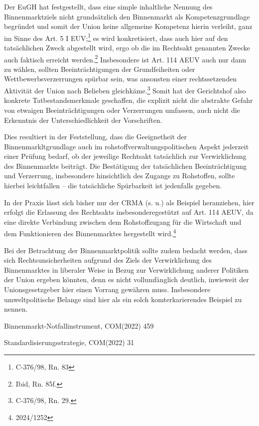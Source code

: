 \documentclass[12pt,a4paper,oneside]{book} %
\begin{document}
Der EuGH hat festgestellt, dass eine simple inhaltliche Nennung des Binnenmarktziels nicht grundsätzlich den Binnenmarkt als Kompetenzgrundlage begründet und somit der Union keine allgemeine Kompetenz hierin verleiht, ganz im Sinne des Art. 5 I EUV;\footnote{C-376/98, Rn. 83} es wird konkretisiert, dass auch hier auf den tatsächlichen Zweck abgestellt wird, ergo ob die im Rechtsakt genannten Zwecke auch faktisch erreicht werden.\footnote{Ibid, Rn. 85f.} Insbesondere ist Art. 114 AEUV auch nur dann zu wählen, sollten Beeinträchtigungen der Grundfeiheiten oder Wettbewerbsverzerrungen spürbar sein, was ansonsten einer rechtssetzenden Aktivität der Union nach Belieben gleichkäme.\footnote{C-376/98, Rn. 29.} Somit hat der Gerichtshof also konkrete Tatbestandsmerkmale geschaffen, die explizit nicht die abstrakte Gefahr von etwaigen Beeinträchtigungen oder Verzerrungen umfassen, auch nicht die Erkenntnis der Unterschiedlichkeit der Vorschriften.\autocite[hierzu ausführlich]{Callies, Berliner Beiträge 117, S. 16}

Dies resultiert in der Feststellung, dass die Geeignetheit der Binnenmarkltgrundlage auch im rohstoffverwaltungspolitischen Aspekt jederzeit einer Prüfung bedarf, ob der jeweilige Rechtsakt tatsächlich zur Verwirklichung des Binnenmarkts beiträgt. Die Bestätigung der tatsächlichen Beeinträchtigung und Verzerrung, insbesondere hinsichtlich des Zugangs zu Rohstoffen, sollte hierbei leichtfallen -- die tatsächliche Spürbarkeit ist jedenfalls gegeben.
	
In der Praxis lässt sich bisher nur der CRMA (s. u.) als Beispiel heranziehen, hier erfolgt die Erlassung des Rechtsakts \grqq insbesondere\glqq gestützt auf Art. 114 AEUV, da eine direkte Verbindung zwischen dem Rohstoffzugang für die Wirtschaft und dem Funktionieren des Binnenmarktes hergestellt wird.\footnote{2024/1252}
	
Bei der Betrachtung der Binnenmarktpolitik sollte zudem bedacht werden, dass sich Rechtsunsicherheiten aufgrund des Ziels der Verwirklichung des Binnenmarktes in liberaler Weise in Bezug zur Verwirklichung anderer Politiken der Union ergeben könnten, denn es nicht vollumfänglich deutlich, inwieweit der Unionsgesetzgeber hier einen Vorrang gewähren muss.\autocite[§23 Rn 10]{classen_europarecht_2021} Insbesondere umweltpolitische Belange sind hier als ein solch komterkarierendes Beispiel zu nennen.
	
Binnenmarkt-Notfallinstrument, COM(2022) 459
	
Standardisierungsstrategie, COM(2022) 31
	
\end{document}
